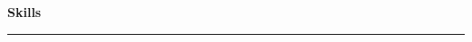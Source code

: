 \documentclass[12pt, oneside]{article}
\newcommand{\headingstyleSJobs}[1] {
	{\fontsize{20pt}{1em}\selectfont \bf \textcolor{new_red}{#1}}
	\textcolor{new_red}{\rule{3.25in}{0.5pt}} \vspace{-10pt}
}
\newcommand{\jobtitle}[3] {
	{\bf #1} {#2} • {#3} \vspace{-10pt} \\
}
\begin{document}
\begin{flushleft}




\headingstyleSJobs{Skills}


\end{flushleft}
\end{document}
